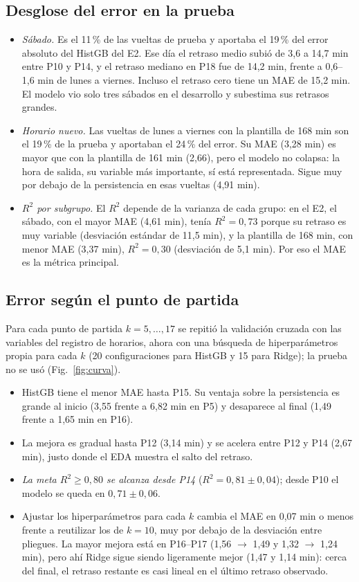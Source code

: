 \documentclass[conference,spanish]{IEEEtran}
\begin{document}
\subsection{Desglose del error en la prueba}\label{sec:desglose}
\begin{itemize}
    \item \emph{Sábado.} Es el 11\,\% de las vueltas de prueba y aportaba el 19\,\% del error absoluto del HistGB del E2. Ese día el retraso medio subió de 3,6 a 14,7 min entre P10 y P14, y el retraso mediano en P18 fue de 14,2 min, frente a 0,6--1,6 min de lunes a viernes. Incluso el retraso cero tiene un MAE de 15,2 min. El modelo vio solo tres sábados en el desarrollo y subestima sus retrasos grandes.
    \item \emph{Horario nuevo.} Las vueltas de lunes a viernes con la plantilla de 168 min son el 19\,\% de la prueba y aportaban el 24\,\% del error. Su MAE (3,28 min) es mayor que con la plantilla de 161 min (2,66), pero el modelo no colapsa: la hora de salida, su variable más importante, sí está representada. Sigue muy por debajo de la persistencia en esas vueltas (4,91 min).
    \item \emph{$R^2$ por subgrupo.} El $R^2$ depende de la varianza de cada grupo: en el E2, el sábado, con el mayor MAE (4,61 min), tenía $R^2=0{,}73$ porque su retraso es muy variable (desviación estándar de 11,5 min), y la plantilla de 168 min, con menor MAE (3,37 min), $R^2=0{,}30$ (desviación de 5,1 min). Por eso el MAE es la métrica principal.
\end{itemize}

\subsection{Error según el punto de partida}\label{sec:curva}
Para cada punto de partida $k=5,\dots,17$ se repitió la validación cruzada con las variables del registro de horarios, ahora con una búsqueda de hiperparámetros propia para cada $k$ (20 configuraciones para HistGB y 15 para Ridge); la prueba no se usó (Fig.~\ref{fig:curva}).
\begin{itemize}
    \item HistGB tiene el menor MAE hasta P15. Su ventaja sobre la persistencia es grande al inicio (3,55 frente a 6,82 min en P5) y desaparece al final (1,49 frente a 1,65 min en P16).
    \item La mejora es gradual hasta P12 (3,14 min) y se acelera entre P12 y P14 (2,67 min), justo donde el EDA muestra el salto del retraso.
    \item \emph{La meta $R^2\ge0{,}80$ se alcanza desde P14} ($R^2=0{,}81\pm0{,}04$); desde P10 el modelo se queda en $0{,}71\pm0{,}06$.
    \item Ajustar los hiperparámetros para cada $k$ cambia el MAE en 0,07 min o menos frente a reutilizar los de $k=10$, muy por debajo de la desviación entre pliegues. La mayor mejora está en P16--P17 (1,56 $\to$ 1,49 y 1,32 $\to$ 1,24 min), pero ahí Ridge sigue siendo ligeramente mejor (1,47 y 1,14 min): cerca del final, el retraso restante es casi lineal en el último retraso observado.
\end{itemize}
\end{document}
